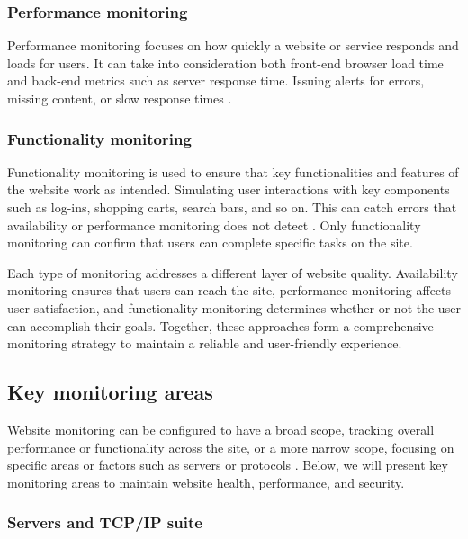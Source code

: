 \subsubsection{Performance monitoring}
\label{subsubsec:performance_monitoring}


Performance monitoring focuses on how quickly a website or service responds and loads for users. It can take into consideration both front-end browser load time and back-end metrics such as server response time. Issuing alerts for errors, missing content, or slow response times \autocite{Uptrendsmonitoring}.

\subsubsection{Functionality monitoring}
\label{subsubsec:functionality_monitoring}


Functionality monitoring is used to ensure that key functionalities and features of the website work as intended. Simulating user interactions with key components such as log-ins, shopping carts, search bars, and so on. This can catch errors that availability or performance monitoring does not detect \autocite{testRigor}. Only functionality monitoring can confirm that users can complete specific tasks on the site.

Each type of monitoring addresses a different layer of website quality. Availability monitoring ensures that users can reach the site, performance monitoring affects user satisfaction, and functionality monitoring determines whether or not the user can accomplish their goals. Together, these approaches form a comprehensive monitoring strategy to maintain a reliable and user-friendly experience.

\subsection{Key monitoring areas}
\label{subsec:key_monitoring_areas}


Website monitoring can be configured to have a broad scope, tracking overall performance or functionality across the site, or a more narrow scope, focusing on specific areas or factors such as servers or protocols \autocite{IBMwebmonitor}. Below, we will present key monitoring areas to maintain website health, performance, and security.

\subsubsection{Servers and TCP/IP suite}
\label{subsubsec:servers_tcp/ip_suite}


